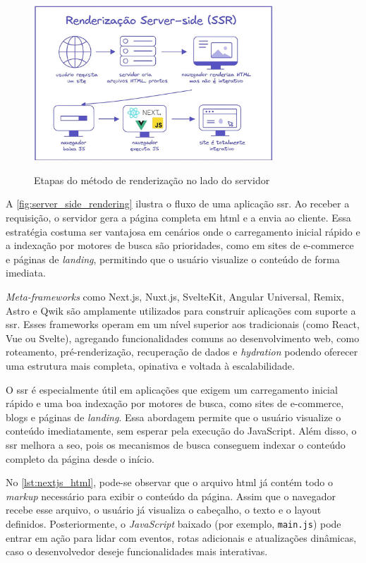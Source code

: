 \begin{figure}[H]
  \centering
  \caption{Etapas do método de renderização no lado do servidor}
  \includegraphics[width=0.8\textwidth]{media/server_side_rendering.jpeg}
  \label{fig:server_side_rendering}
\end{figure}

A \autoref{fig:server_side_rendering} ilustra o fluxo de uma aplicação \acrshort{ssr}. Ao receber a requisição, o servidor gera a página completa em \acrshort{html} e a envia ao cliente. Essa estratégia costuma ser vantajosa em cenários onde o carregamento inicial rápido e a indexação por motores de busca são prioridades, como em sites de e-commerce e páginas de \emph{landing}, permitindo que o usuário visualize o conteúdo de forma imediata. 

\emph{Meta-frameworks} como Next.js, Nuxt.js, SvelteKit, Angular Universal, Remix, Astro e Qwik são amplamente utilizados para construir aplicações com suporte a \acrshort{ssr}. Esses frameworks operam em um nível superior aos tradicionais (como React, Vue ou Svelte), agregando funcionalidades comuns ao desenvolvimento web, como roteamento, pré-renderização, recuperação de dados e \emph{hydration} podendo oferecer uma estrutura mais completa, opinativa e voltada à escalabilidade.

O \acrshort{ssr} é especialmente útil em aplicações que exigem um carregamento inicial rápido e uma boa indexação por motores de busca, como sites de e-commerce, blogs e páginas de \emph{landing}. Essa abordagem permite que o usuário visualize o conteúdo imediatamente, sem esperar pela execução do JavaScript. Além disso, o \acrshort{ssr} melhora a \acrshort{seo}, pois os mecanismos de busca conseguem indexar o conteúdo completo da página desde o início.

No \autoref{lst:nextjs_html}, pode-se observar que o arquivo \acrshort{html} já contém todo o \emph{markup} necessário para exibir o conteúdo da página. Assim que o navegador recebe esse arquivo, o usuário já visualiza o cabeçalho, o texto e o layout definidos. Posteriormente, o \emph{JavaScript} baixado (por exemplo, \texttt{main.js}) pode entrar em ação para lidar com eventos, rotas adicionais e atualizações dinâmicas, caso o desenvolvedor deseje funcionalidades mais interativas.

